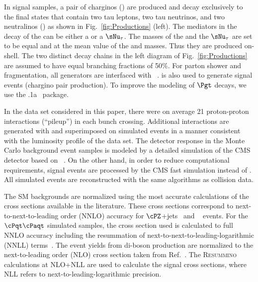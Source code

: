 In signal samples, a pair of charginos (\chione) 
are produced and decay exclusively to the final states that contain two tau leptons, two tau neutrinos, and %
two neutralinos (\PSGczDo) as shown in Fig.~\ref{fig:Productions} (left). 
The mediators in the decay of the \chione can be either a \sTau or a $\sNu_{\tau}$. 
The masses of the \sTau and the $\sNu_{\tau}$ are set to be equal and at the mean value of the \chione and \PSGczDo masses. 
Thus they are produced on-shell.
The two distinct decay chains in the left diagram of Fig.~\ref{fig:Productions} 
are assumed to have equal branching fractions of 50\%. 
For parton shower and fragmentation, all generators are interfaced with ~\cite{Sjostrand:2006za}.
\PYTHIA is also used to generate signal events (chargino pair production). To improve the modeling of $\Pgt$ decays, 
we use the .1a~\cite{Davidson:2010rw} package. 


In the data set considered in this paper,
there were on average 21 proton-proton interactions (``pileup'') in each bunch crossing.
Additional interactions are generated with \PYTHIA and superimposed on simulated events in a manner consistent with the
luminosity profile of the data set.
The detector response in the Monte Carlo background event samples is modeled by a
detailed simulation
of the CMS detector based on {\GEANTfour}~\cite{Agostinelli:2002hh}.  
On the other hand, in order to reduce  computational requirements, signal events 
are processed by the CMS fast simulation \cite{Abdullin:2011zz} instead of {\GEANTfour}. 
All simulated events are reconstructed with the same algorithms as collision data.

The SM backgrounds are normalized using the most accurate calculations of the cross sections available 
in the literature. These cross sections correspond to next-to-next-to-leading order (NNLO) accuracy for $\cPZ$+jets~\cite{Melnikov:2006kv} 
and \wjets~\cite{xsec_WZ} events. For the $\cPqt\cPaqt$ simulated samples, the cross section used is calculated to full NNLO accuracy including
the resummation of next-to-next-to-leading-logarithmic (NNLL) terms~\cite{Czakon:2011xx}. %
The event yields from di-boson production are normalized to the next-to-leading order (NLO) cross section  taken from Ref.~\cite{Campbell:2011bn}. 
The \textsc{Resummino}~\cite{Fuks:2012qx,Fuks:2013vua,Fuks:2013lya} calculations at NLO+NLL are used to calculate the signal cross sections, where 
NLL refers to next-to-leading-logarithmic precision.
